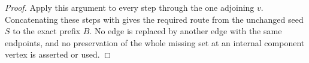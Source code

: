 \begin{proof}
Apply this argument to every step through the one adjoining $v$.
Concatenating these steps with
 gives the required route
from the unchanged seed $S$ to the exact prefix $B$. No edge is replaced
by another edge with the same endpoints, and no preservation of the
whole missing set at an internal component vertex is asserted or used.
\end{proof}
